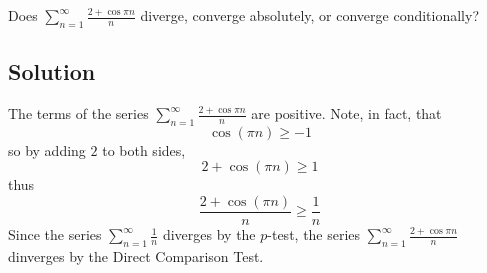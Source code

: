 \documentclass{article}
\begin{document}
\noindent
Does $\displaystyle \sum_{n=1}^\infty \frac{2+ \cos \pi n}{n}$
diverge, converge absolutely, or converge conditionally?

\subsection*{Solution}

The terms of the series $\displaystyle \sum_{n=1}^\infty \frac{2+ \cos \pi n}{n}$ are positive. Note, in fact, that
\[\cos (\pi n) \geq -1\]
so by adding $2$ to both sides,
\[2 + \cos (\pi n) \geq 1\]
thus
\[ \frac{2 + \cos (\pi n)}{n} \geq \frac1n\]
Since the series $\displaystyle \sum_{n=1}^\infty \frac1n$ diverges by the $p$-test, the series
$\displaystyle \sum_{n=1}^\infty \frac{2+ \cos \pi n}{n}$ dinverges by the Direct Comparison Test.
\end{document}
